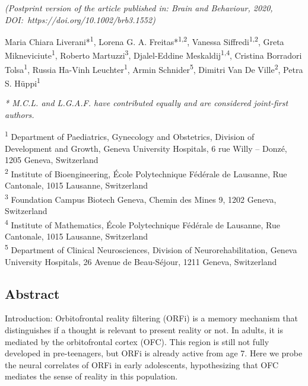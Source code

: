 \begin{center}
\textit{(Postprint version of the article published in: Brain and Behaviour, 2020,  DOI:~https://doi.org/10.1002/brb3.1552)}

Maria Chiara Liverani*\textsuperscript{1}, Lorena G. A. Freitas*\textsuperscript{1,2}, Vanessa Siffredi\textsuperscript{1,2}, Greta Mikneviciute\textsuperscript{1}, Roberto Martuzzi\textsuperscript{3}, Djalel-Eddine Meskaldij\textsuperscript{1,4}, Cristina Borradori Tolsa\textsuperscript{1}, Russia Ha-Vinh Leuchter\textsuperscript{1}, Armin Schnider\textsuperscript{5}, Dimitri Van De Ville\textsuperscript{2}, Petra S. Hüppi\textsuperscript{1}

\textit{* M.C.L. and L.G.A.F. have contributed equally and are considered joint-first authors.}

\end{center}

\textsuperscript{1} Department of Paediatrics, Gynecology and Obstetrics, Division of Development and Growth, Geneva University Hospitals, 6 rue Willy – Donzé, 1205 Geneva, Switzerland \\
\textsuperscript{2} Institute of Bioengineering, École Polytechnique Fédérale de Lausanne, Rue Cantonale, 1015 Lausanne, Switzerland  \\
\textsuperscript{3} Foundation Campus Biotech Geneva, Chemin des Mines 9, 1202 Geneva, Switzerland  \\
\textsuperscript{4} Institute of Mathematics, École Polytechnique Fédérale de Lausanne, Rue Cantonale, 1015 Lausanne, Switzerland  \\
\textsuperscript{5} Department of Clinical Neurosciences, Division of Neurorehabilitation, Geneva University Hospitals, 26 Avenue de Beau-Séjour, 1211 Geneva, Switzerland  \\

\subsection*{Abstract}

Introduction: Orbitofrontal reality filtering (ORFi) is a memory mechanism that distinguishes if a thought is relevant to present reality or not. In adults, it is mediated by the orbitofrontal cortex (OFC). This region is still not fully developed in pre-teenagers, but ORFi is already active from age 7. Here we probe the neural correlates of ORFi in early adolescents, hypothesizing that OFC mediates the sense of reality in this population.

